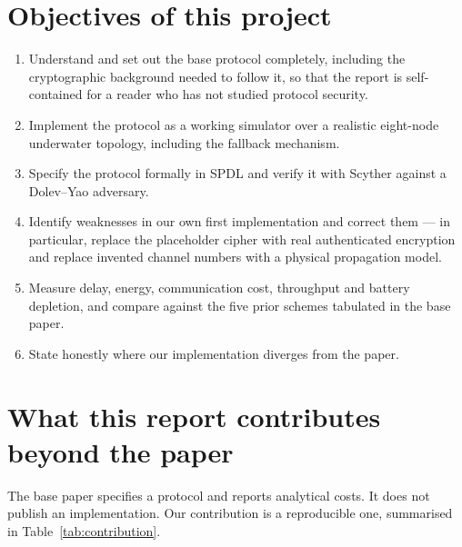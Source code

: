 \section{Objectives of this project}

\begin{enumerate}
\item Understand and set out the base protocol completely, including the cryptographic
      background needed to follow it, so that the report is self-contained for a reader who
      has not studied protocol security.
\item Implement the protocol as a working simulator over a realistic eight-node underwater
      topology, including the fallback mechanism.
\item Specify the protocol formally in SPDL and verify it with Scyther against a
      Dolev--Yao adversary.
\item Identify weaknesses in our own first implementation and correct them --- in
      particular, replace the placeholder cipher with real authenticated encryption and
      replace invented channel numbers with a physical propagation model.
\item Measure delay, energy, communication cost, throughput and battery depletion, and
      compare against the five prior schemes tabulated in the base paper.
\item State honestly where our implementation diverges from the paper.
\end{enumerate}

\section{What this report contributes beyond the paper}

The base paper specifies a protocol and reports analytical costs. It does not publish an
implementation. Our contribution is a reproducible one, summarised in
Table~\ref{tab:contribution}.

